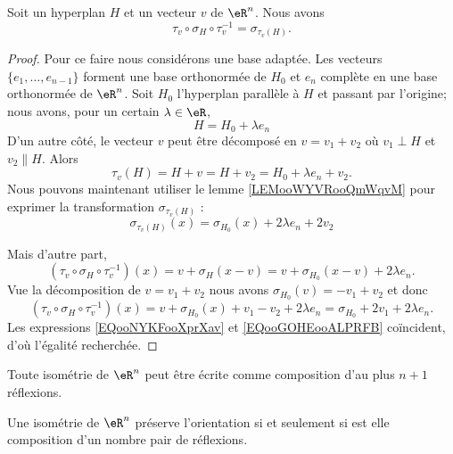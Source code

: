 \begin{lemma}       \label{LEMooMCVKooKzmlAg}
    Soit un hyperplan \( H\) et un vecteur \( v\) de \( \eR^n\). Nous avons
    \begin{equation}
        \tau_v\circ \sigma_H\circ\tau_v^{-1}=\sigma_{\tau_v(H)}.
    \end{equation}
\end{lemma}

\begin{proof}
    Pour ce faire nous considérons une base adaptée. Les vecteurs \( \{ e_1,\ldots, e_{n-1} \}\) forment une base orthonormée de \( H_0\) et \( e_n\) complète en une base orthonormée de \( \eR^n\). Soit \( H_0\) l'hyperplan parallèle à \( H\) et passant par l'origine; nous avons, pour un certain \( \lambda\in \eR\),
    \begin{equation}
        H=H_0+\lambda e_n
    \end{equation}
    D'un autre côté, le vecteur \( v\) peut être décomposé en \( v=v_1+v_2\) où \( v_1\perp H\) et \( v_2\parallel H\). Alors 
    \begin{equation}
        \tau_v(H)=H+v=H+v_2=H_0+\lambda e_n+v_2.
    \end{equation}
    Nous pouvons maintenant utiliser le lemme \ref{LEMooWYVRooQmWqvM} pour exprimer la transformation \( \sigma_{\tau_v(H)}\) :
    \begin{equation}        \label{EQooNYKFooXprXav}
        \sigma_{\tau_v(H)}(x)=\sigma_{H_0}(x)+ 2\lambda e_n+2v_2
    \end{equation}
    
    Mais d'autre part, 
    \begin{equation}
        (\tau_v\circ \sigma_H\circ\tau_{v}^{-1})(x)=v+\sigma_H(x-v)=v+\sigma_{H_0}(x-v)+2\lambda e_n.
    \end{equation}
    Vue la décomposition de \( v=v_1+v_2\) nous avons \( \sigma_{H_0}(v)=-v_1+v_2\) et donc
    \begin{equation}        \label{EQooGOHEooALPRFB}
        (\tau_v\circ \sigma_H\circ\tau_{v}^{-1})(x)= v+  \sigma_{H_0}(x)+v_1-v_2+2\lambda e_n=\sigma_{H_0}+2v_1+2\lambda e_n.
    \end{equation}
    Les expressions \eqref{EQooNYKFooXprXav} et \eqref{EQooGOHEooALPRFB} coïncident, d'où l'égalité recherchée.
\end{proof}

\begin{theorem}
    Toute isométrie de \( \eR^n\) peut être écrite comme composition d'au plus \( n+1\) réflexions.
    
    Une isométrie de \( \eR^n\) préserve l'orientation si et seulement si est elle composition d'un nombre pair de réflexions.
\end{theorem}

